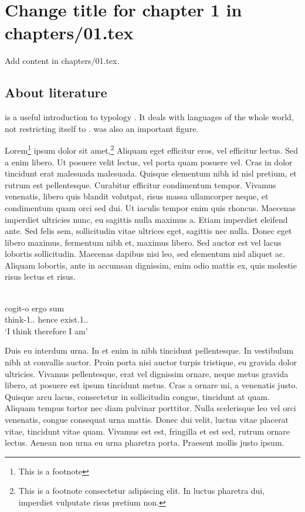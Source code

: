 \chapter{Change title for chapter 1 in chapters/01.tex}
Add content in chapters/01.tex.

\section{About literature}
\citet{Comrie1981} is a useful introduction to typology . %
It deals with languages of the whole world, not restricting itself to . %
 was also an important figure. %

Lorem\footnote{This is a footnote} ipsum dolor sit 
amet,\footnote{This is a footnote consectetur adipiscing elit. In luctus pharetra dui, imperdiet vulputate risus pretium non.} Aliquam eget efficitur eros, vel efficitur lectus. Sed a enim libero. Ut posuere velit lectus, vel porta quam posuere vel. Cras in dolor tincidunt erat malesuada malesuada. Quisque elementum nibh id nisl pretium, et rutrum est pellentesque. Curabitur efficitur condimentum tempor. Vivamus venenatis, libero quis blandit volutpat, risus massa ullamcorper neque, et condimentum quam orci sed dui. Ut iaculis tempor enim quis rhoncus. Maecenas imperdiet ultricies nunc, eu sagittis nulla maximus a. Etiam imperdiet eleifend ante. Sed felis sem, sollicitudin vitae ultrices eget, sagittis nec nulla. Donec eget libero maximus, fermentum nibh et, maximus libero. Sed auctor est vel lacus lobortis sollicitudin. Maecenas dapibus nisi leo, sed elementum nisl aliquet ac. Aliquam lobortis, ante in accumsan dignissim, enim odio mattis ex, quis molestie risus lectus et risus. 

\ea\label{ex:1:descartes}
\\
\gll cogit-o ergo sum \\
     think-1{\sg}.{\prs}.{\ind} hence exist.1{\sg}.{\prs}.{\ind}\\
\glt `I think therefore I am'
\z

Duis eu interdum urna. In et enim in nibh tincidunt pellentesque. In vestibulum nibh at convallis auctor. Proin porta nisi auctor turpis tristique, eu gravida dolor ultricies. Vivamus pellentesque, erat vel dignissim ornare, neque metus gravida libero, at posuere est ipsum tincidunt metus. Cras a ornare mi, a venenatis justo. Quisque arcu lacus, consectetur in sollicitudin congue, tincidunt at quam. Aliquam tempus tortor nec diam pulvinar porttitor. Nulla scelerisque leo vel orci venenatis, congue consequat urna mattis. Donec dui velit, luctus vitae placerat vitae, tincidunt vitae quam. Vivamus est est, fringilla et est sed, rutrum ornare lectus. Aenean non urna eu urna pharetra porta. Praesent mollis justo ipsum. 

